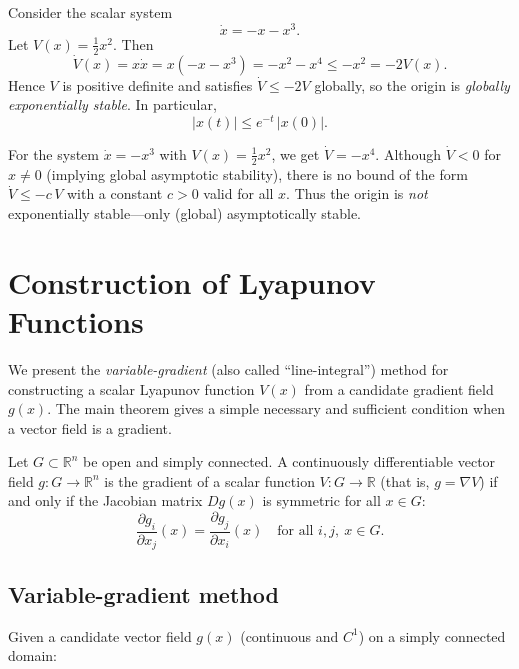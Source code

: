\begin{example}
Consider the scalar system
\begin{equation}
    \dot{x} = -x - x^3.
\end{equation}
Let $V(x)=\tfrac{1}{2}x^2$. Then
\begin{equation}
    \dot{V}(x) = x\dot{x} = x(-x-x^3) = -x^2 - x^4 \le -x^2 = -2V(x).
\end{equation}
Hence $V$ is positive definite and satisfies $\dot{V}\le -2V$ globally, so the origin is
\emph{globally exponentially stable}. In particular,
\begin{equation}
    |x(t)| \le e^{-t}\,|x(0)|.
\end{equation}
\end{example}

\begin{remark}
For the system $\dot{x}=-x^3$ with $V(x)=\tfrac{1}{2}x^2$, we get $\dot{V}=-x^4$.
Although $\dot{V}<0$ for $x\neq 0$ (implying global asymptotic stability), there is no bound of the form
$\dot{V}\le -c\,V$ with a constant $c>0$ valid for all $x$. Thus the origin is \emph{not} exponentially
stable—only (global) asymptotically stable.
\end{remark}

\section{Construction of Lyapunov Functions}

We present the \emph{variable-gradient} (also called ``line-integral'') method for constructing a scalar Lyapunov function \(V(x)\) from a candidate gradient field \(g(x)\). The main theorem gives a simple necessary and sufficient condition when a vector field is a gradient.

\begin{theorem}
Let \(G\subset\mathbb{R}^n\) be open and simply connected. A continuously differentiable vector field \(g:G\to\mathbb{R}^n\) is the gradient of a scalar function \(V:G\to\mathbb{R}\) (that is, \(g=\nabla V\)) if and only if the Jacobian matrix \(Dg(x)\) is symmetric for all \(x\in G\):
\[
\frac{\partial g_i}{\partial x_j}(x)=\frac{\partial g_j}{\partial x_i}(x)
\quad\text{for all }i,j,\ x\in G.
\]
\end{theorem}

\subsection{Variable-gradient method}
Given a candidate vector field \(g(x)\) (continuous and \(C^1\)) on a simply connected domain:

